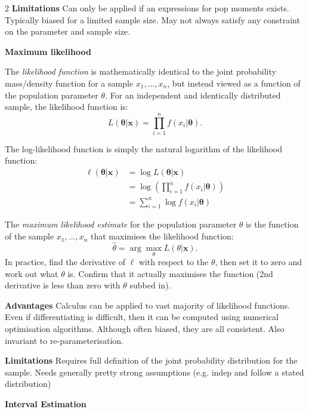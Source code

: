 \documentclass[10pt]{extarticle}
\theoremstyle{definition}
\theoremstyle{remark}
\begin{document}
\begin{multicols}{2}
    \textbf{Limitations} Can only be applied if an expressions for pop moments
    exists. Typically biased for a limited sample size. May not always satisfy
    any constraint on the parameter and sample size. 

    \textbf{Maximum likelihood}

    The \textit{likelihood function} is mathematically identical to the joint
    probability mass/density function for a sample $x_1 , \ldots , x_n$, but
    instead viewed as a function of the population parameter $\theta$. For an
    independent and identically distributed sample, the likelihood function is:
    \[
        L(\boldsymbol{\theta} | \mathbf{x}) = \prod_{i=1}^n f(x_i | \boldsymbol{\theta}).
    \]

    The log-likelihood function is simply the natural logarithm of the
    likelihood function:
    \begin{align*}
        \ell(\boldsymbol{\theta} | \mathbf{x}) &= \log{L(\boldsymbol{\theta} | \mathbf{x})} \\
                                               &= \log\left(\prod_{i=1}^n f(x_i | \boldsymbol{\theta}) \right) \\
                                               &= \sum_{i=1}^n \log{f(x_i | \boldsymbol{\theta})}
    \end{align*}

    The \textit{maximum likelihood estimate} for the population parameter
    $\theta$ is the function of the sample $x_1 , \ldots , x_n$ that maximises
    the likelihood function:
    \[
        \hat{\theta} = \arg\max_\theta L(\theta | \mathbf{x}).
    \] In practice, find the derivative of $\ell$ with respect to the $\theta$, 
    then set it to zero and work out what $\theta$ is. Confirm that it actually 
    maximises the function (2nd derivative is less than zero with $\theta$
    subbed in).

    \textbf{Advantages} Calculus can be applied to vast majority of likelihood
    functions. Even if differentiating is difficult, then it can be computed
    using numerical optimisation algorithms. Although often biased, they are all 
    consistent. Also invariant to re-parameterisation. 

    \textbf{Limitations} Requires full definition of the joint probability
    distribution for the sample. Needs generally pretty strong assumptions
    (e.g. indep and follow a stated distribution)

    \noindent
    \textbf{Interval Estimation}


\end{multicols}
\end{document}
